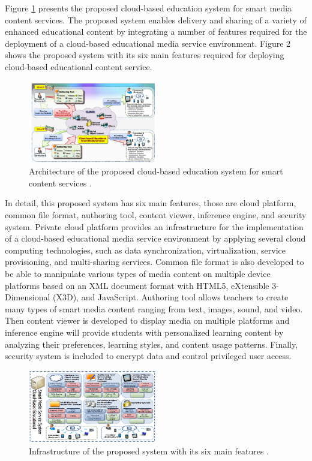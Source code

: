 \documentclass[journal]{vgtc}
\begin{document}
  Figure \ref{archi} presents the proposed cloud-based education system for smart media content services. The proposed system enables delivery and sharing of a variety of enhanced educational content by integrating a number of features required for the deployment of a cloud-based educational media service environment. Figure 2 shows the proposed system with its six main features required for deploying cloud-based educational content service.

  \begin{figure}[t]
    \centering
    \includegraphics[width=0.5\textwidth]{content-oriented-archi}
    \caption{Architecture of the proposed cloud-based education system for smart content services \cite{jeong2013content}.}
    \label{archi}
  \end{figure}

  In detail, this proposed system has six main features, those are cloud platform, common file format, authoring tool, content viewer, inference engine, and security system. Private cloud platform provides an infrastructure for the implementation of a cloud-based educational media service environment by applying several cloud computing technologies, such as data synchronization, virtualization, service provisioning, and multi-sharing services. Common file format is also developed to be able to manipulate various types of media content on multiple device platforms based on an XML document format with HTML5, eXtensible 3-Dimensional (X3D), and JavaScript. Authoring tool allows teachers to create many types of smart media content ranging from text, images, sound, and video. Then content viewer is developed to display media on multiple platforms and inference engine will provide students with personalized learning content by analyzing their preferences, learning styles, and content usage patterns. Finally, security system is included to encrypt data and control privileged user access.

  \begin{figure}[!b]
    \centering
    \includegraphics[width=0.5\textwidth]{content-oriented-feature}
    \caption{Infrastructure of the proposed system with its six main features \cite{jeong2013content}.}
    \label{feature}
  \end{figure}
\end{document}
